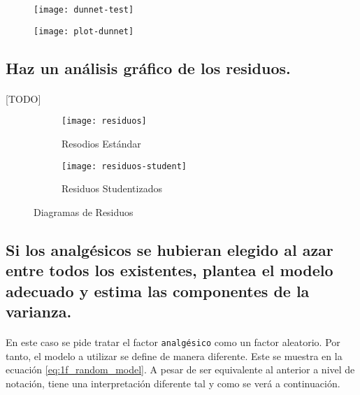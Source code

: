 \documentclass[11pt]{article}
\begin{document}
      \begin{figure}[H]
        \centering
        \texttt{[image: dunnet-test]}
        \caption{}
        \label{}
      \end{figure}

      \begin{figure}[H]
        \centering
        \texttt{[image: plot-dunnet]}
        \caption{}
        \label{}
      \end{figure}


    \subsection{Haz un análisis gráfico de los residuos.}

      \paragraph{}
      [TODO]

      \begin{figure}[H]
        \centering
        \begin{subfigure}{.5\textwidth}
          \centering
          \texttt{[image: residuos]}
          \caption{Resodios Estándar}
          \label{fig:sub1}
        \end{subfigure}%
        \begin{subfigure}{.5\textwidth}
          \centering
          \texttt{[image: residuos-student]}
          \caption{Residuos Studentizados}
          \label{fig:sub2}
        \end{subfigure}
        \caption{Diagramas de Residuos}
        \label{fig:test}
      \end{figure}

    \subsection{Si los analgésicos se hubieran elegido al azar entre todos los existentes, plantea el modelo adecuado y estima las componentes de la varianza.}

      \paragraph{}
      En este caso se pide tratar el factor \texttt{analgésico} como un factor aleatorio. Por tanto, el modelo a utilizar se define de manera diferente. Este se muestra en la ecuación \eqref{eq:1f_random_model}. A pesar de ser equivalente al anterior a nivel de notación, tiene una interpretación diferente tal y como se verá a continuación.
\end{document}
